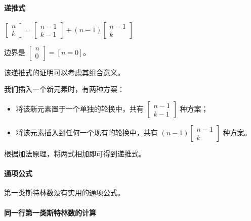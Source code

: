 \documentclass[]{article}
\providecommand{\tightlist}{%
  \setlength{\itemsep}{0pt}\setlength{\parskip}{0pt}}
\let\oldparagraph\paragraph
\renewcommand{\paragraph}[1]{\oldparagraph{#1}\mbox{}}
\begin{document}
\hypertarget{ux9012ux63a8ux5f0f-1}{%
\paragraph{递推式}\label{ux9012ux63a8ux5f0f-1}}

\(\begin{bmatrix}n\\ k\end{bmatrix}=\begin{bmatrix}n-1\\ k-1\end{bmatrix}+(n-1)\begin{bmatrix}n-1\\ k\end{bmatrix}\)

边界是 \(\begin{bmatrix}n\\ 0\end{bmatrix}=[n=0]\)。

该递推式的证明可以考虑其组合意义。

我们插入一个新元素时，有两种方案：

\begin{itemize}
\tightlist
\item
  将该新元素置于一个单独的轮换中，共有
  \(\begin{bmatrix}n-1\\ k-1\end{bmatrix}\) 种方案；
\item
  将该元素插入到任何一个现有的轮换中，共有
  \((n-1)\begin{bmatrix}n-1\\ k\end{bmatrix}\) 种方案。
\end{itemize}

根据加法原理，将两式相加即可得到递推式。

\hypertarget{ux901aux9879ux516cux5f0f-1}{%
\paragraph{通项公式}\label{ux901aux9879ux516cux5f0f-1}}

第一类斯特林数没有实用的通项公式。

\hypertarget{ux540cux4e00ux884cux7b2cux4e00ux7c7bux65afux7279ux6797ux6570ux7684ux8ba1ux7b97}{%
\paragraph{同一行第一类斯特林数的计算}\label{ux540cux4e00ux884cux7b2cux4e00ux7c7bux65afux7279ux6797ux6570ux7684ux8ba1ux7b97}}
\end{document}
